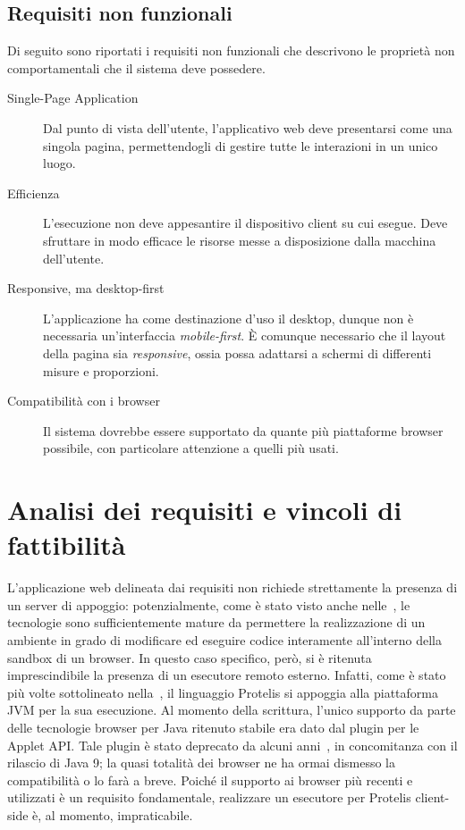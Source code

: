     \subsection{Requisiti non funzionali}\label{subsec:req:non-fun}
      Di seguito sono riportati i requisiti non funzionali che descrivono le proprietà non comportamentali che il sistema deve possedere.

      \begin{description}
        \item[Single-Page Application]
          Dal punto di vista dell'utente, l'applicativo web deve presentarsi come una singola pagina, permettendogli di gestire tutte le interazioni in un unico luogo.

        \item[Efficienza]
          L'esecuzione non deve appesantire il dispositivo client su cui esegue.
          Deve sfruttare in modo efficace le risorse messe a disposizione dalla macchina dell'utente.

        \item[Responsive, ma desktop-first]
          L'applicazione ha come destinazione d'uso il desktop, dunque non è necessaria un'interfaccia \emph{mobile-first}.
          È comunque necessario che il layout della pagina sia \emph{responsive}, ossia possa adattarsi a schermi di differenti misure e proporzioni.

        \item[Compatibilità con i browser]
          Il sistema dovrebbe essere supportato da quante più piattaforme browser possibile, con particolare attenzione a quelli più usati.
      \end{description}

  \section{Analisi dei requisiti e vincoli di fattibilità}

    L'applicazione web delineata dai requisiti non richiede strettamente la presenza di un server di appoggio:
    potenzialmente, come è stato visto anche nelle~, le tecnologie sono sufficientemente mature
    da permettere la realizzazione di un ambiente in grado di modificare ed eseguire codice interamente all'interno della sandbox di un browser.
    In questo caso specifico, però, si è ritenuta imprescindibile la presenza di un esecutore remoto esterno.
    Infatti, come è stato più volte sottolineato nella~, il linguaggio Protelis si appoggia alla piattaforma JVM per la sua esecuzione.
    Al momento della scrittura, l'unico supporto da parte delle tecnologie browser per Java ritenuto stabile era dato dal plugin per le Applet API\@.
    Tale plugin è stato deprecato da alcuni anni~\cite{jep289}, in concomitanza con il rilascio di Java 9;
    la quasi totalità dei browser ne ha ormai dismesso la compatibilità o lo farà a breve.
    Poiché il supporto ai browser più recenti e utilizzati è un requisito fondamentale, realizzare un esecutore per Protelis client-side è, al momento, impraticabile.

